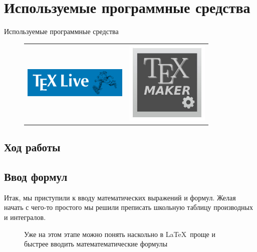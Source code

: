 \documentclass{beamer}[aspectratio=169]
\begin{document}
\section{Используемые программные средства}
\begin{frame}{Используемые программные средства}
\transwipe
\begin{figure}[h]
\begin{tabular}{cc}
\includegraphics[width=5cm,height=2cm]{texlive}
&
\includegraphics[width=4cm,height=4cm]{texmaker}
\end{tabular}
\end{figure}

\end{frame}

\begin{frame}
\section{Ход работы}
\subsection{Ввод формул}
\transwipe
Итак, мы приступили к вводу математических выражений и формул. Желая начать с чего-то простого мы решили преписать школьную таблицу производных и интегралов.
\begin{figure}[h!]
\setlength{\fboxsep}{0pt}%
\setlength{\fboxrule}{1pt}%
%
\caption{Уже на этом этапе можно понять наскольно в \LaTeX \  проще и быстрее вводить математематические формулы}
\label{fig:image}
\end{figure}
\end{frame}
\end{document}
